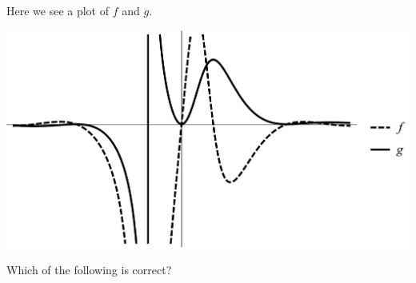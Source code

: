 \documentclass{ximera}
\author{Bart Snapp}
\begin{document}
\begin{exercise}
Here we see a plot of $f$ and $g$. 
\begin{image}
\includegraphics[width=.5\textwidth]{graphFandG5.png}
\end{image}
Which of the following is correct?
\begin{multipleChoice}
\end{multipleChoice}
\end{exercise}
\end{document}
